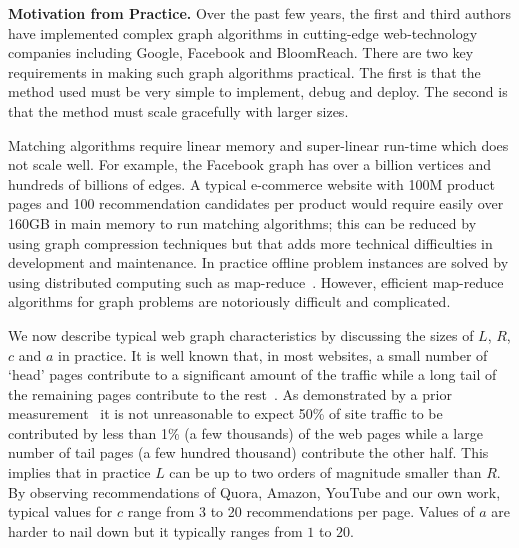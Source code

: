 \noindent
{\bf Motivation from Practice.} Over the past few years, the first and
third authors have implemented complex graph algorithms in
cutting-edge web-technology companies including Google, Facebook and
BloomReach. There are two key requirements in making such graph algorithms
practical. The first is that the method used must be very simple to
implement, debug and deploy. The second is that the method must scale
gracefully with larger sizes. \vs

Matching algorithms require linear memory and super-linear run-time
which does not scale well. For example, the Facebook graph has over a
billion vertices\cite{FacebookNodes} and hundreds of billions of edges. A typical
e-commerce website with 100M product pages and 100 recommendation candidates per
product would require easily over 160GB in main memory to run matching
algorithms; this can be reduced by using graph compression techniques but that adds more technical difficulties in development and maintenance. In practice offline problem instances are solved by using distributed computing such as map-reduce~\cite{DeanGhemawat2004}. However, efficient map-reduce algorithms for graph problems are notoriously difficult and complicated. \vs


We now describe typical web graph characteristics by discussing the sizes of $L$, $R$, $c$ and $a$ in practice. It is well known
that, in most websites,  a small number of `head' pages contribute to a
significant amount of the traffic while a long tail of the remaining
pages contribute to the rest~\cite{HubermanAdamic1999, DuDemmerBrewer2006}. As
demonstrated by a prior measurement~\cite{KumarNorrisSun2009}
it is not unreasonable to expect 50\% of site traffic to be
contributed by less than 1\% (a few thousands) of the web pages while a
large number of tail pages (a few hundred thousand) contribute
the other half. This implies that in practice $L$ can
be up to two orders of magnitude smaller than $R$.  By observing
recommendations of Quora, Amazon, YouTube and our own work,
typical values for $c$ range from 3 to 20 recommendations per page. Values of $a$ are harder to nail down but it typically ranges from $1$ to $20$. \vs


